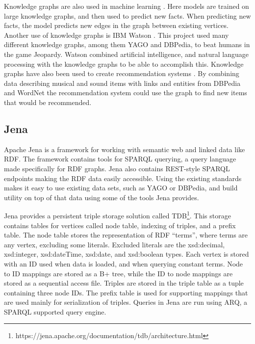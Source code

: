 Knowledge graphs are also used in machine learning \cite{nickel2015review}. Here models are trained on large knowledge graphs, and then used to predict new facts. When predicting new facts, the model predicts new edges in the graph between existing vertices. Another use of knowledge graphs is IBM Watson \cite{ferrucci2010building}. This project used many different knowledge graphs, among them YAGO and DBPedia, to beat humans in the game Jeopardy. Watson combined artificial intelligence, and natural language processing with the knowledge graphs to be able to accomplish this. Knowledge graphs have also been used to create recommendation systems \cite{oramas2016sound}. By combining data describing musical and sound items with links and entities from DBPedia and WordNet the recommendation system could use the graph to find new items that would be recommended. 

\subsection{Jena}
Apache Jena is a framework for working with semantic web and linked data like RDF. The framework contains tools for SPARQL querying, a query language made specifically for RDF graphs. Jena also contains REST-style SPARQL endpoints making the RDF data easily accessible. Using the existing standards makes it easy to use existing data sets, such as YAGO or DBPedia, and build utility on top of that data using some of the tools Jena provides.

Jena provides a persistent triple storage solution called TDB\footnote{https://jena.apache.org/documentation/tdb/architecture.html}. This storage contains tables for vertices called node table, indexing of triples, and a prefix table. The node table stores the representation of RDF ``terms'', where terms are any vertex, excluding some literals. Excluded literals are the xsd:decimal, xsd:integer, xsd:dateTime, xsd:date, and xsd:boolean types. Each vertex is stored with an ID used when data is loaded, and when querying constant terms. Node to ID mappings are stored as a B+ tree, while the ID to node mappings are stored as a sequential access file. Triples are stored in the triple table as a tuple containing three node IDs. The prefix table is used for supporting mappings that are used mainly for serialization of triples. Queries in Jena are run using ARQ, a SPARQL supported query engine.

\glsresetall
